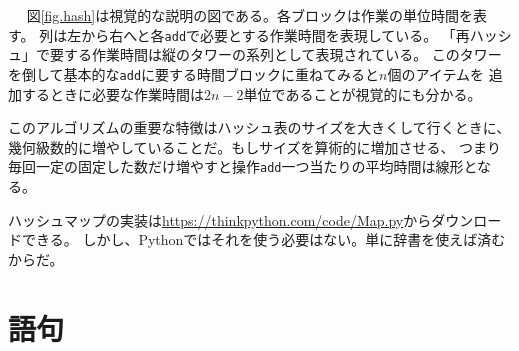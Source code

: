 \documentclass[a4j,12pt,makeidx]{jbook}
\begin{document}
\indent　
図\ref{fig.hash}は視覚的な説明の図である。各ブロックは作業の単位時間を表す。
列は左から右へと各{\tt add}で必要とする作業時間を表現している。
「再ハッシュ」で要する作業時間は縦のタワーの系列として表現されている。
このタワーを倒して基本的な{\tt add}に要する時間ブロックに重ねてみると$n$個のアイテムを
追加するときに必要な作業時間は$2n-2$単位であることが視覚的にも分かる。\par
このアルゴリズムの重要な特徴はハッシュ表のサイズを大きくして行くときに、
幾何級数的に増やしていることだ。もしサイズを算術的に増加させる、
つまり毎回一定の固定した数だけ増やすと操作{\tt add}一つ当たりの平均時間は線形となる。\par
ハッシュマップの実装は\url{https://thinkpython.com/code/Map.py}からダウンロードできる。
しかし、Pythonではそれを使う必要はない。単に辞書を使えば済むからだ。
%
\section{語句}
\end{document}
